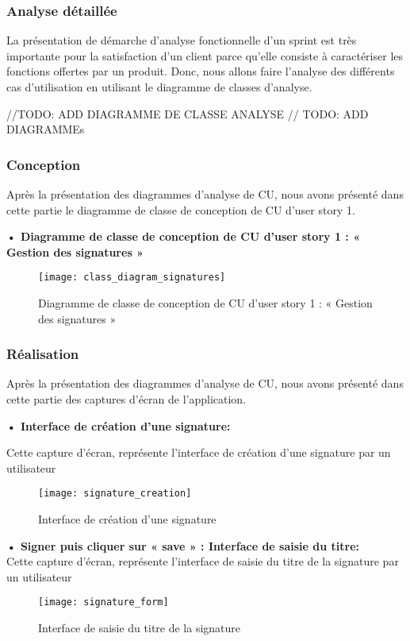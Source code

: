 \subsubsection{Analyse détaillée}
La présentation de démarche d'analyse fonctionnelle d'un sprint est très importante pour la satisfaction d'un client parce qu'elle consiste à caractériser les fonctions offertes par un produit.
Donc, nous allons faire l'analyse des différents cas d'utilisation en utilisant le diagramme de classes d'analyse.

//TODO: ADD DIAGRAMME DE CLASSE ANALYSE
// TODO: ADD DIAGRAMMEs

\subsubsection{Conception}

Après la présentation des diagrammes d'analyse de CU, nous avons présenté dans cette partie le diagramme de classe de conception de CU d'user story 1.

\textbf{•	Diagramme de classe de conception de CU d'user story 1 : « Gestion des signatures »}

\begin{figure}[h]
  \centering
  \texttt{[image: class\_diagram\_signatures]}
  \caption{Diagramme de classe de conception de CU d'user story 1 : « Gestion des signatures »}
  \label{fig:UseCaseDiagramSignatures}
\end{figure}

\subsubsection{Réalisation}

Après la présentation des diagrammes d'analyse de CU, nous avons présenté dans cette partie des captures d'écran de l'application.

\textbf{•	Interface de création d'une signature:}

Cette capture d'écran, représente l'interface de création d'une signature par un utilisateur

\begin{figure}[h]
  \centering
  \texttt{[image: signature\_creation]}
  \caption{Interface de création d'une signature}
  \label{fig:signature_creation}
\end{figure}

\textbf{•	Signer puis cliquer sur « save » : Interface de saisie du titre:}\\
Cette capture d'écran, représente l'interface de saisie du titre de la signature par un utilisateur
\begin{figure}[h]
  \centering
  \texttt{[image: signature\_form]}
  \caption{Interface de saisie du titre de la signature}
  \label{fig:signature_title}
\end{figure}

